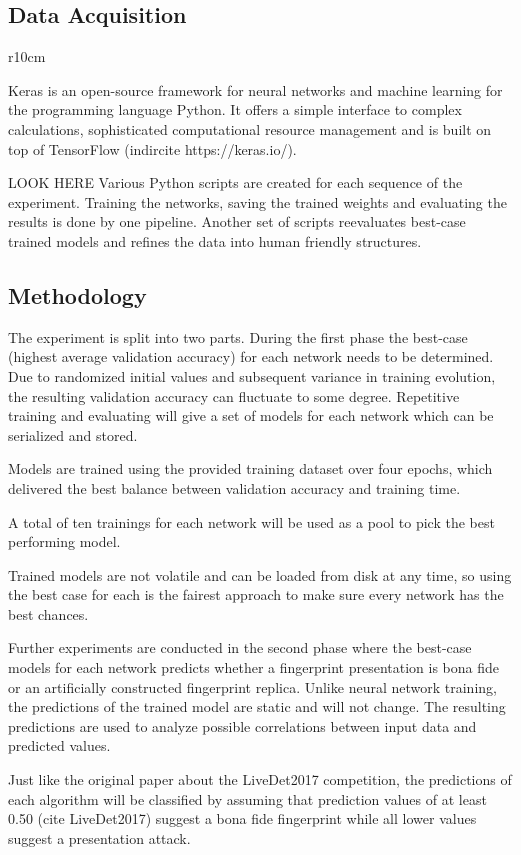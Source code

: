 \begin{figure}[!htb]
    
\end{figure}


\newpage


\subsection{Data Acquisition}
\begin{wrapfigure}[13]{r}{10cm}
    
\end{wrapfigure}
Keras is an open-source framework for neural networks and machine learning for the programming language Python.
It offers a simple interface to complex calculations, sophisticated computational resource management and is built on top of TensorFlow (indircite https://keras.io/).

LOOK  HERE Various Python scripts are created for each sequence of the experiment.
Training the networks, saving the trained weights and evaluating the results is done by one pipeline.
Another set of scripts reevaluates best-case trained models and refines the data into human friendly structures.




\subsection{Methodology}
The experiment is split into two parts.
During the first phase the best-case (highest average validation accuracy) for each network needs to be determined.
Due to randomized initial values and subsequent variance in training evolution, the resulting validation accuracy can fluctuate to some degree.
Repetitive training and evaluating will give a set of models for each network which can be serialized and stored.

Models are trained using the provided training dataset over four epochs, which delivered the best balance between validation accuracy and training time.

A total of ten trainings for each network will be used as a pool to pick the best performing model.

\noindent
Trained models are not volatile and can be loaded from disk at any time, so using the best case for each is the fairest approach to make sure every network has the best chances.


\medskip\noindent
Further experiments are conducted in the second phase where the best-case models for each network predicts whether a fingerprint presentation is bona fide or an artificially constructed fingerprint replica.
Unlike neural network training, the predictions of the trained model are static and will not change.
The resulting predictions are used to analyze possible correlations between input data and predicted values.

Just like the original paper about the LiveDet2017 competition, the predictions of each algorithm will be classified by assuming that prediction values of at least 0.50 (cite LiveDet2017) suggest a bona fide fingerprint while all lower values suggest a presentation attack.

